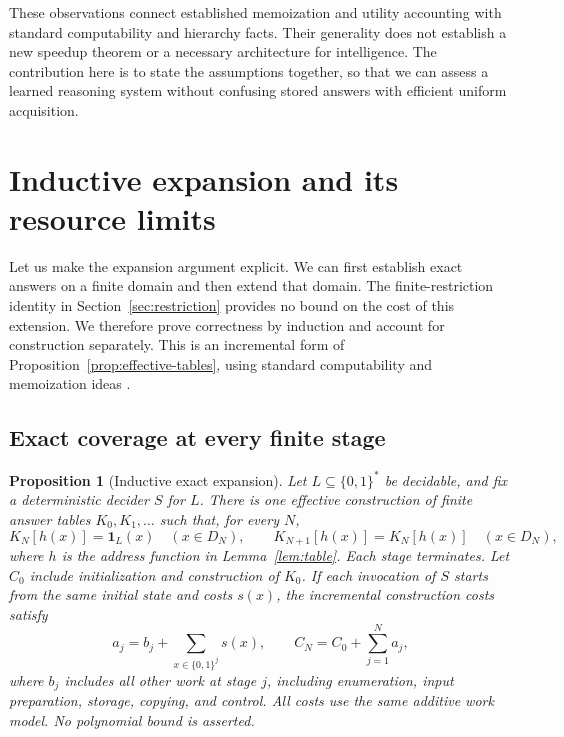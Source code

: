 \documentclass[11pt,a4paper]{article}
\numberwithin{equation}{section}
\newcommand{\bits}{\{0,1\}}
\newcommand{\ind}{\mathbf{1}}
\theoremstyle{plain}
\newtheorem{proposition}[lemma]{Proposition}
\theoremstyle{definition}
\theoremstyle{remark}
\begin{document}
These observations connect established memoization and utility accounting with standard computability and hierarchy facts. Their generality does not establish a new speedup theorem or a necessary architecture for intelligence. The contribution here is to state the assumptions together, so that we can assess a learned reasoning system without confusing stored answers with efficient uniform acquisition.

\section{Inductive expansion and its resource limits}
\label{sec:inductive-expansion}

Let us make the expansion argument explicit. We can first establish exact answers on a finite domain and then extend that domain. The finite-restriction identity in Section~\ref{sec:restriction} provides no bound on the cost of this extension. We therefore prove correctness by induction and account for construction separately. This is an incremental form of Proposition~\ref{prop:effective-tables}, using standard computability and memoization ideas \citep{turing1937computable,michie1968}.

\subsection{Exact coverage at every finite stage}

\begin{proposition}[Inductive exact expansion]
\label{prop:inductive-expansion}
Let $L\subseteq\bits^*$ be decidable, and fix a deterministic decider $S$ for $L$. There is one effective construction of finite answer tables $K_0,K_1,\ldots$ such that, for every $N$,
\begin{equation}
K_N[h(x)]=\ind_L(x)\quad(x\in D_N),\qquad
K_{N+1}[h(x)]=K_N[h(x)]\quad(x\in D_N),
\label{eq:expansion-invariant}
\end{equation}
where $h$ is the address function in Lemma~\ref{lem:table}. Each stage terminates. Let $C_0$ include initialization and construction of $K_0$. If each invocation of $S$ starts from the same initial state and costs $s(x)$, the incremental construction costs satisfy
\begin{equation}
a_j=b_j+\sum_{x\in\bits^j}s(x),\qquad
C_N=C_0+\sum_{j=1}^{N}a_j,
\label{eq:expansion-cost}
\end{equation}
where $b_j$ includes all other work at stage $j$, including enumeration, input preparation, storage, copying, and control. All costs use the same additive work model. No polynomial bound is asserted.
\end{proposition}
\end{document}
